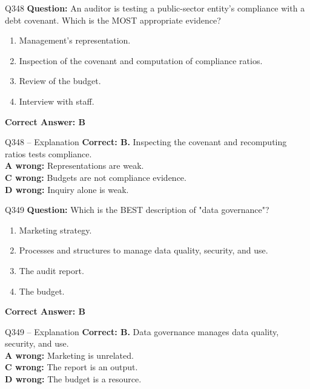 \documentclass[aspectratio=169,10pt]{beamer}
\begin{document}
	\begin{frame}[t]{Q348}
		\small
		\textbf{Question:} An auditor is testing a public-sector entity's compliance with a debt covenant. Which is the MOST appropriate evidence?
		\begin{enumerate}[label=\Alph*.,itemsep=1pt,topsep=2pt]
			\item Management's representation.
			\item Inspection of the covenant and computation of compliance ratios.
			\item Review of the budget.
			\item Interview with staff.
		\end{enumerate}
		\vspace{4pt}
		\textbf{Correct Answer: B}
	\end{frame}
	
	\begin{frame}[t]{Q348 -- Explanation}
		\small
		\textbf{Correct: B.} Inspecting the covenant and recomputing ratios tests compliance. \\[4pt]
		\textbf{A wrong:} Representations are weak. \\[2pt]
		\textbf{C wrong:} Budgets are not compliance evidence. \\[2pt]
		\textbf{D wrong:} Inquiry alone is weak.
	\end{frame}
	
	\begin{frame}[t]{Q349}
		\small
		\textbf{Question:} Which is the BEST description of "data governance"?
		\begin{enumerate}[label=\Alph*.,itemsep=1pt,topsep=2pt]
			\item Marketing strategy.
			\item Processes and structures to manage data quality, security, and use.
			\item The audit report.
			\item The budget.
		\end{enumerate}
		\vspace{4pt}
		\textbf{Correct Answer: B}
	\end{frame}
	
	\begin{frame}[t]{Q349 -- Explanation}
		\small
		\textbf{Correct: B.} Data governance manages data quality, security, and use. \\[4pt]
		\textbf{A wrong:} Marketing is unrelated. \\[2pt]
		\textbf{C wrong:} The report is an output. \\[2pt]
		\textbf{D wrong:} The budget is a resource.
	\end{frame}
	
\end{document}
